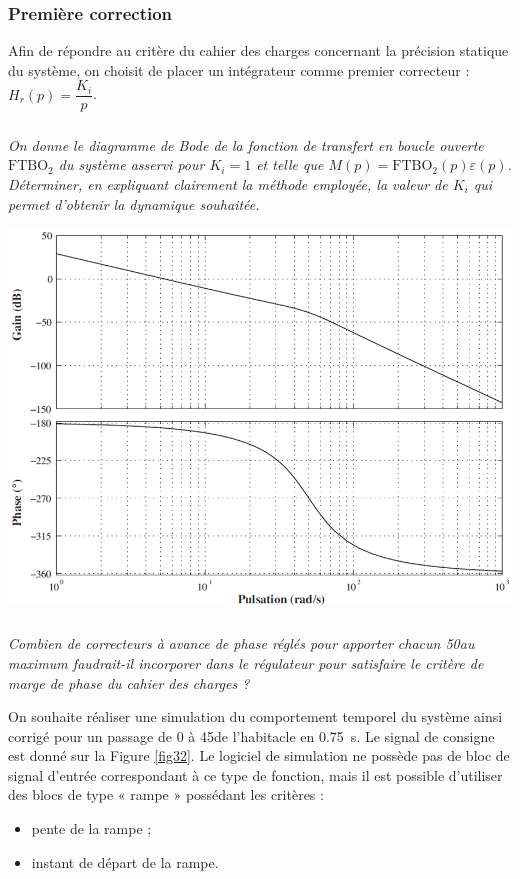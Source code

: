 \begin{multicols}{2}
\begin{multicols}{2}
\subsubsection*{Première correction}

Afin de répondre au critère du cahier des charges concernant la précision statique du système, on choisit de placer un intégrateur comme premier correcteur :  $H_r(p)=\dfrac{K_i}{p}$.



\subparagraph{}
\textit{On donne le diagramme de Bode de la fonction de transfert en boucle ouverte $\text{FTBO}_2$ du système asservi pour $K_i = 1$ et telle que $M(p) = \text{FTBO}_2(p) \varepsilon(p)$. Déterminer, en expliquant clairement la méthode employée, la valeur de $K_i$ qui permet d'obtenir la dynamique souhaitée.}
\ifprof
\begin{corrige}
\end{corrige}
\else
\fi

\begin{center}
\includegraphics[width=\linewidth]{images/pt_37}
\end{center}

\subparagraph{}
\textit{Combien de correcteurs à avance de phase réglés pour apporter chacun 50\degres au maximum faudrait-il incorporer dans le régulateur pour satisfaire le critère de marge de phase du cahier des charges ?
}
\ifprof
\begin{corrige}
\end{corrige}
\else
\fi


On souhaite réaliser une simulation du comportement temporel du système ainsi corrigé pour un passage de 0 à 45\degres de l'habitacle en \SI{0,75}{s}. Le signal de consigne est donné sur la Figure \ref{fig32}. Le logiciel de simulation ne possède pas de bloc de signal d'entrée correspondant à ce type de fonction, mais il est possible d'utiliser des blocs de type « rampe » possédant les critères :
\begin{itemize}
\item pente de la rampe ;
\item instant de départ de la rampe.
\end{itemize}
 


\end{multicols}
\end{multicols}

